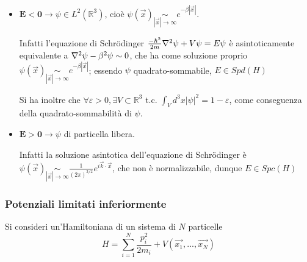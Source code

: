 \begin{itemize}
    \item $\mathbf{E<0} \to \psi\in L^2(\mathbb{R}^3)$, cioè 
	$\psi(\vec{x}) \underset{|\vec{x}|\to\infty}\sim e^{-\beta |\vec{x}|}$.
	
	Infatti l'equazione di Schrödinger
	$\frac{-\hbar^2}{2m}\laplacian\psi+V\psi=E\psi$ è asintoticamente equivalente
	a $\laplacian\psi - \beta^2\psi \sim 0$, che ha come soluzione proprio
	$\psi(\vec{x}) \underset{|\vec{x}|\to\infty}\sim e^{-\beta |\vec{x}|}$;
	essendo $\psi$ quadrato-sommabile, $E\in Spd(H)$
    
	Si ha inoltre che $\forall \varepsilon>0, \exists V\subset\mathbb{R}^3$ t.c.
	$\int_{V}^{}d^3x|\psi|^2 = 1-\varepsilon$, come conseguenza della
	quadrato-sommabilità di $\psi$.
    \item $\mathbf{E>0} \to \psi$ di particella libera.

	Infatti la soluzione asintotica dell'equazione di Schrödinger è
	$\psi(\vec{x})\underset{|\vec{x}|\to\infty}\sim
	\frac{1}{(2\pi)^{3/2}}e^{i\vec{k}\cdot\vec{x}}$, che non è normalizzabile,
	dunque $E\in Spc(H)$
\end{itemize}
\subsubsection{Potenziali limitati inferiormente}
Si consideri un'Hamiltoniana di un sistema di $N$ particelle 
$$H = \sum_{i=1}^{N}\frac{p_i^2}{2m_i}+ V(\vec{x_1},...,\vec{x_N})$$

